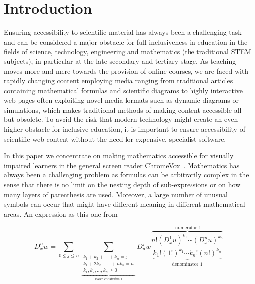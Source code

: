 \documentclass{sig-alternate}
\begin{document}
\section{Introduction}\label{sec:intro} 
$\!$Ensuring accessibility to scientific material has always been a challenging
task and can be considered a major obstacle for full inclusiveness in education
in the fields of science, technology, engineering and mathematics (the
traditional STEM subjects), in particular at the late secondary and tertiary
stage. As teaching moves more and more towards the provision of online courses,
we are faced with rapidly changing content employing media ranging from
traditional articles containing mathematical formulas and scientific diagrams to
highly interactive web pages often exploiting novel media formats such as
dynamic diagrams or simulations, which makes traditional methods of making
content accessible all but obsolete. To avoid the risk that modern technology
might create an even higher obstacle for inclusive education, it is important to
ensure accessibility of scientific web content without the need for expensive,
specialist software.

In this paper we concentrate on making mathematics accessible for visually
impaired learners in the general screen reader
ChromeVox~\cite{google:chromevox-tutorial}. Mathematics has always been a
challenging problem as formulas can be arbitrarily complex in the sense that
there is no limit on the nesting depth of sub-expressions or on how many layers
of parenthesis are used. Moreover, a large number of unusual symbols can occur
that might have different meaning in different mathematical areas. An expression
as this one from~\cite{knuthart}

 {\small
\begin{equation*}
D^n_xw = \sum_{0\le j\le n} \sum_{\underbrace{
    \substack{\scriptstyle
      k_1+k_2+\cdots+k_n=j \\
      \scriptstyle
      k_1+2k_2+\cdots+nk_n=n \\
      \scriptstyle
      k_1,k_2,\ldots,k_n\ge0 }}_{\mbox{lower constraint
        1}}} D^j_u w
  \frac{\overbrace{n!  {(D^1_x u)}^{k_1} \cdots
      {(D^n_x u)}^{k_n}} ^{\mbox{ numerator 1}}}
  {\underbrace{k_1!{(1!)}^{k_1}
    \cdots k_n!{(n!)}^{k_n}}_{\mbox{denominator 1}}}
\end{equation*}}
\EndAccSupp{}
\end{document}
